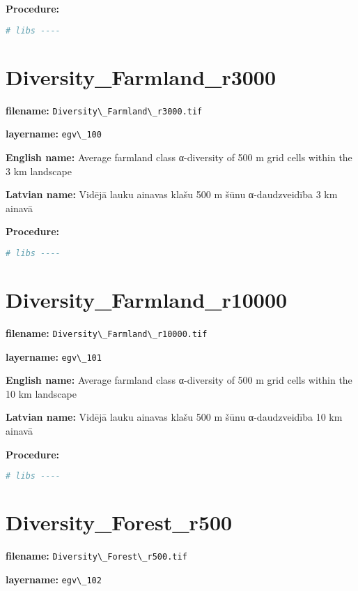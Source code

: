 \documentclass[
]{book}
\newcommand{\passthrough}[1]{#1}
\begin{document}
\textbf{Procedure:}

\begin{lstlisting}[language=R]
# libs ----
\end{lstlisting}

\section{Diversity\_Farmland\_r3000}\label{ch06.100}

\textbf{filename:} \passthrough{\lstinline!Diversity\_Farmland\_r3000.tif!}

\textbf{layername:} \passthrough{\lstinline!egv\_100!}

\textbf{English name:} Average farmland class α-diversity of 500 m grid cells within the 3 km landscape

\textbf{Latvian name:} Vidējā lauku ainavas klašu 500 m šūnu α-daudzveidība 3 km ainavā

\textbf{Procedure:}

\begin{lstlisting}[language=R]
# libs ----
\end{lstlisting}

\section{Diversity\_Farmland\_r10000}\label{ch06.101}

\textbf{filename:} \passthrough{\lstinline!Diversity\_Farmland\_r10000.tif!}

\textbf{layername:} \passthrough{\lstinline!egv\_101!}

\textbf{English name:} Average farmland class α-diversity of 500 m grid cells within the 10 km landscape

\textbf{Latvian name:} Vidējā lauku ainavas klašu 500 m šūnu α-daudzveidība 10 km ainavā

\textbf{Procedure:}

\begin{lstlisting}[language=R]
# libs ----
\end{lstlisting}

\section{Diversity\_Forest\_r500}\label{ch06.102}

\textbf{filename:} \passthrough{\lstinline!Diversity\_Forest\_r500.tif!}

\textbf{layername:} \passthrough{\lstinline!egv\_102!}
\end{document}
